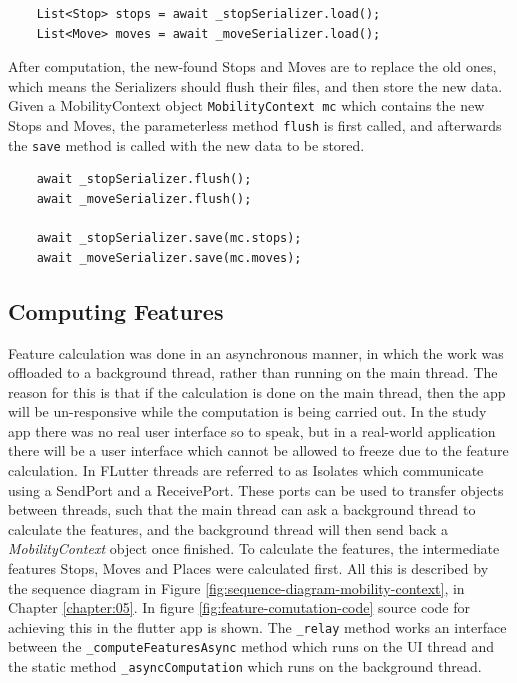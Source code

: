 \begin{verbatim}
    List<Stop> stops = await _stopSerializer.load();
    List<Move> moves = await _moveSerializer.load();
\end{verbatim}

After computation, the new-found Stops and Moves are to replace the old ones, which means the Serializers should flush their files, and then store the new data. Given a MobilityContext object \verb|MobilityContext mc| which contains the new Stops and Moves, the parameterless method \verb|flush| is first called, and afterwards the \verb|save| method is called with the new data to be stored.
\begin{verbatim}
    await _stopSerializer.flush();
    await _moveSerializer.flush();

    await _stopSerializer.save(mc.stops);
    await _moveSerializer.save(mc.moves);
\end{verbatim}

\subsection{Computing Features}
Feature calculation was done in an asynchronous manner, in which the work was offloaded to a background thread, rather than running on the main thread. The reason for this is that if the calculation is done on the main thread, then the app will be un-responsive while the computation is being carried out. In the study app there was no real user interface so to speak, but in a real-world application there will be a user interface which cannot be allowed to freeze due to the feature calculation. In FLutter threads are referred to as Isolates which communicate using a SendPort and a ReceivePort. These ports can be used to transfer objects between threads, such that the main thread can ask a background thread to calculate the features, and the background thread will then send back a \textit{MobilityContext} object once finished. To calculate the features, the intermediate features Stops, Moves and Places were calculated first. All this is described by the sequence diagram in Figure \ref{fig:sequence-diagram-mobility-context}, in Chapter \ref{chapter:05}. In figure \ref{fig:feature-comutation-code} source code for achieving this in the flutter app is shown. The \verb|_relay| method works an interface between the \verb|_computeFeaturesAsync| method which runs on the UI thread and the static method \verb|_asyncComputation| which runs on the background thread.


